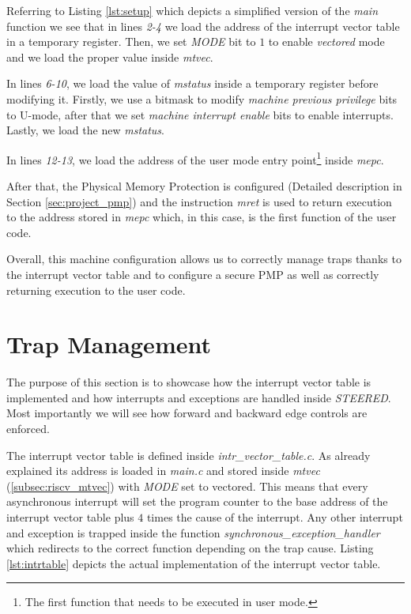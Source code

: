 Referring to Listing \ref{lst:setup} which depicts a simplified version of the \textit{main}
function we see that in lines \textit{2-4} we load the address of the interrupt vector
table in a temporary register. Then, we set \textit{MODE} bit to $1$ to enable
\textit{vectored} mode and we load the proper value inside \textit{mtvec}.

In lines \textit{6-10}, we load the value of \textit{mstatus} inside a temporary
register before modifying it. Firstly, we use a bitmask to modify \textit{machine
previous privilege} bits to U-mode, after that we set \textit{machine interrupt
enable} bits to enable interrupts. Lastly, we load the new \textit{mstatus}.

In lines \textit{12-13}, we load the address of the user mode entry point\footnote{The
first function that needs to be executed in user mode.} inside \textit{mepc}.

After that, the Physical Memory Protection is configured (Detailed description in
Section \ref{sec:project_pmp}) and the instruction \textit{mret} is used to return
execution to the address stored in \textit{mepc} which, in this case, is the
first function of the user code.

Overall, this machine configuration allows us to correctly manage traps thanks to
the interrupt vector table and to configure a secure PMP as well as correctly returning
execution to the user code.

\section{Trap Management}
\label{sec:project_isr}

The purpose of this section is to showcase how the interrupt vector table is
implemented and how interrupts and exceptions are handled inside \textit{STEERED}.
Most importantly we will see how forward and backward edge controls are enforced.

The interrupt vector table is defined inside \textit{intr\_vector\_table.c}. As
already explained its address is loaded in \textit{main.c} and stored inside \textit{mtvec}
(\ref{subsec:riscv_mtvec}) with \textit{MODE} set to vectored. This means that
every asynchronous interrupt will set the program counter to the base address of
the interrupt vector table plus $4$ times the cause of the interrupt. Any other interrupt
and exception is trapped inside the function \textit{synchronous\_exception\_handler}
which redirects to the correct function depending on the trap cause. Listing \ref{lst:intrtable}
depicts the actual implementation of the interrupt vector table.

